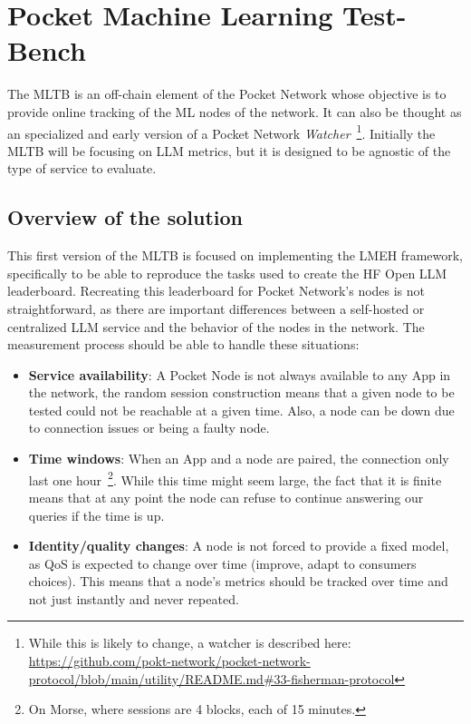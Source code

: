 \section{Pocket Machine Learning Test-Bench}\label{sec:c}

The \gls{MLTB} is an off-chain element of the Pocket Network whose objective is to provide online tracking of the \gls{ML} nodes of the network. It can also be thought as an specialized and early version of a Pocket Network \emph{Watcher}~\footnote{While this is likely to change, a watcher is described here: \url{https://github.com/pokt-network/pocket-network-protocol/blob/main/utility/README.md\#33-fisherman-protocol}}.
Initially the \gls{MLTB} will be focusing on \gls{LLM} metrics, but it is designed to be agnostic of the type of service to evaluate.

\subsection{Overview of the solution}

This first version of the \gls{MLTB} is focused on implementing the \gls{LMEH} framework, specifically to be able to reproduce the tasks used to create the \gls{HF} Open \gls{LLM} leaderboard. Recreating this leaderboard for Pocket Network's nodes is not straightforward, as there are important differences between a self-hosted or centralized \gls{LLM} service and the behavior of the nodes in the network. The measurement process should be able to handle these situations:
\begin{itemize}
    \item \textbf{Service availability}: A Pocket Node is not always available to any App in the network, the random session construction means that a given node to be tested could not be reachable at a given time. Also, a node can be down due to connection issues or being a faulty node. 
    \item \textbf{Time windows}: When an App and a node are paired, the connection only last one hour~\footnote{On Morse, where sessions are 4 blocks, each of 15 minutes.}. While this time might seem large, the fact that it is finite means that at any point the node can refuse to continue answering our queries if the time is up.
    \item \textbf{Identity/quality changes}: A node is not forced to provide a fixed model, as \gls{QoS} is expected to change over time (improve, adapt to consumers choices). This means that a node's metrics should be tracked over time and not just instantly and never repeated.
\end{itemize}

